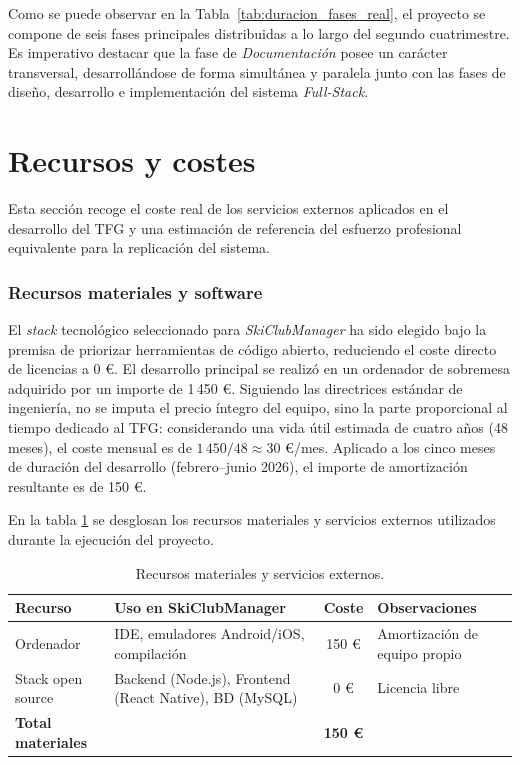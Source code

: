     Como se puede observar en la Tabla~\ref{tab:duracion_fases_real}, el proyecto se compone de seis fases principales distribuidas a lo largo del segundo cuatrimestre. Es imperativo destacar que la fase de \textit{Documentación} posee un carácter transversal, desarrollándose de forma simultánea y paralela junto con las fases de diseño, desarrollo e implementación del sistema \textit{Full-Stack}.
    
    \section{Recursos y costes}
    \label{sec:recursos_costes}

    Esta sección recoge el coste real de los servicios externos aplicados en el desarrollo del TFG y una estimación de referencia del esfuerzo profesional equivalente para la replicación del sistema.

    \subsubsection{Recursos materiales y software}

    El \textit{stack} tecnológico seleccionado para \textit{SkiClubManager} ha sido elegido bajo la premisa de priorizar herramientas de código abierto, reduciendo el coste directo de licencias a 0 €. El desarrollo principal se realizó en un ordenador de sobremesa adquirido por un importe de 1\,450 €. Siguiendo las directrices estándar de ingeniería, no se imputa el precio íntegro del equipo, sino la parte proporcional al tiempo dedicado al TFG: considerando una vida útil estimada de cuatro años (48 meses), el coste mensual es de $1\,450 / 48 \approx 30$ €/mes. Aplicado a los cinco meses de duración del desarrollo (febrero--junio 2026), el importe de amortización resultante es de 150 €.

    En la tabla \ref{tab:recursos_materiales} se desglosan los recursos materiales y servicios externos utilizados durante la ejecución del proyecto.

    \begin{table}[htbp]
    \centering
    \scriptsize
    \renewcommand{\arraystretch}{1.1}
    \begin{tabularx}{\textwidth}{|l|X|c|l|}
    \hline
    \rowcolor[HTML]{EFEFEF} 
    \textbf{Recurso} & \textbf{Uso en SkiClubManager} & \textbf{Coste} & \textbf{Observaciones} \\ \hline
    Ordenador & IDE, emuladores Android/iOS, compilación & 150 € & Amortización de equipo propio \\ \hline
    Stack open source & Backend (Node.js), Frontend (React Native), BD (MySQL) & 0 € & Licencia libre \\ \hline
    \textbf{Total materiales} & & \textbf{150 €} & \\ \hline
    \end{tabularx}
    \caption{Recursos materiales y servicios externos.}
    \label{tab:recursos_materiales}
    \end{table}


